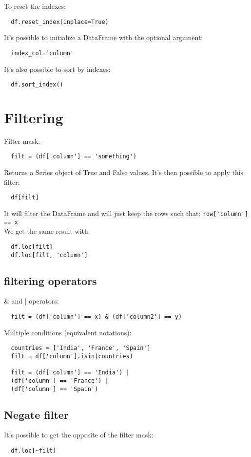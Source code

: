 \documentclass[french]{article}
\begin{document}
To reset the indexes:
\begin{verbatim}
  df.reset_index(inplace=True)
\end{verbatim}
It's possible to initialize a DataFrame with the optional argument:
\begin{verbatim}
  index_col=`column'
\end{verbatim}
It's also possible to sort by indexes:
\begin{verbatim}
  df.sort_index()
\end{verbatim}

\section{Filtering}

Filter mask:
\begin{verbatim}
  filt = (df['column'] == 'something')
\end{verbatim}
Returns a Series object of True and False values. It's then possible to apply this filter:
\begin{verbatim}
  df[filt]
\end{verbatim}
It will filter the DataFrame and will just keep the rows such that: \verb|row['column'] == x|\\
We get the same result with
\begin{verbatim}
  df.loc[filt]
  df.loc[filt, 'column']
\end{verbatim}

\subsection{filtering operators}

\& and | operators:
\begin{verbatim}
  filt = (df['column'] == x) & (df['column2'] == y)
\end{verbatim}

Multiple conditions (equivalent notations):
\begin{verbatim}
  countries = ['India', 'France', 'Spain']
  filt = df['column'].isin(countries)

  filt = (df['column'] == 'India') |
  (df['column'] == 'France') |
  (df['column'] == 'Spain')
\end{verbatim}

\subsection{Negate filter}
It's possible to get the opposite of the filter mask:
\begin{verbatim}
  df.loc[~filt]
\end{verbatim}
\end{document}
